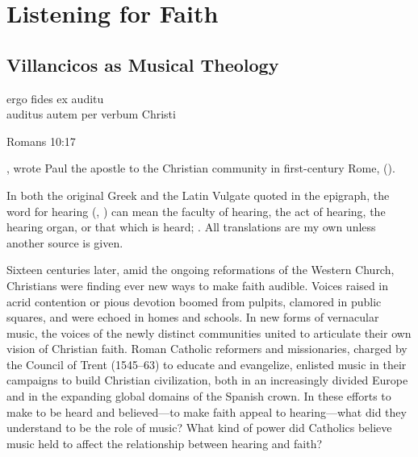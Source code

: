 
% 

\part{Listening for Faith}
\label{part:faith}

\chapter{Villancicos as Musical Theology}
\label{ch:intro}

\epigraph
{ergo fides ex auditu\\
auditus autem per verbum Christi}
{Romans 10:17}

, wrote Paul the apostle to the Christian
community in first-century Rome,  ().%
\begin{Footnote}
    In both the original Greek and the Latin Vulgate quoted in the epigraph,
    the word for hearing (, ) can mean the
    faculty of hearing, the act of hearing, the hearing organ, or that which is
    heard; 
    \Autocite[]{BDAG}.
    All translations are my own unless another source is given.
\end{Footnote}
Sixteen centuries later, amid the ongoing reformations of the Western Church,
Christians were finding ever new ways to make faith audible.
Voices raised in acrid contention or pious devotion boomed from pulpits,
clamored in public squares, and were echoed in homes and schools.  
In new forms of vernacular music, the voices of the newly distinct communities
united to articulate their own vision of Christian faith.
Roman Catholic reformers and missionaries, charged by the Council of Trent
(1545--63) to educate and evangelize, enlisted music in their campaigns to
build Christian civilization, both in an increasingly divided Europe and in the
expanding global domains of the Spanish crown.
In these efforts to make  to be heard and
believed---to make faith appeal to hearing---what did they understand to be the
role of music?
What kind of power did Catholics believe music held to affect the relationship
between hearing and faith?

